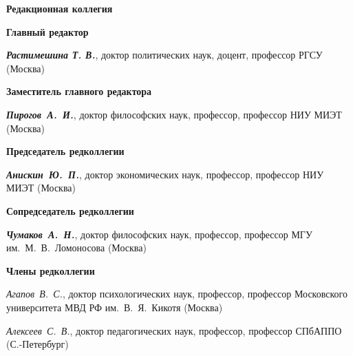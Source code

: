 


\vspace*{-4em}

\begin{center}
    \textbf{Редакционная коллегия}
\end{center}



\begin{multicols}{2}
   \begin{flushleft}
        
    \scriptsize

    \begin{center}
    \textbf{Главный редактор}
    \end{center}

    \noindent     \textit{\textbf{Растимешина Т. В.}}, доктор политических наук, доцент, профессор РГСУ (Москва)

    \begin{center}
    \textbf{Заместитель главного редактора}
    \end{center}

    \noindent     \textit{\textbf{Пирогов А. И.}}, доктор философских наук, профессор, профессор НИУ МИЭТ (Москва)
    
    \begin{center}
    \textbf{Председатель редколлегии}
    \end{center}
    
    \noindent     \textit{\textbf{Анискин Ю. П.}}, доктор экономических наук, профессор, профессор НИУ МИЭТ (Москва)

    \begin{center}
        \textbf{Сопредседатель редколлегии}
    \end{center}
    
    
    \noindent     \textit{\textbf{Чумаков А. Н.}}, доктор философских наук, профессор, профессор МГУ им. М. В. Ломоносова (Москва) 

    \begin{center}
        \textbf{Члены редколлегии}
    \end{center}
    
    
    \noindent  \textit{Агапов В. С.}, доктор психологических наук, профессор, профессор Московского университета МВД РФ им. В. Я. Кикотя (Москва)
    
    \noindent  \textit{Алексеев С. В.}, доктор педагогических наук, профессор, профессор СПбАППО (С.-Петербург)
    

\end{flushleft}
\end{multicols}
